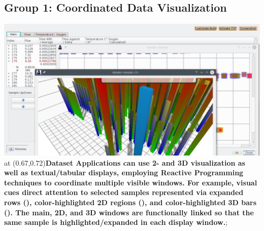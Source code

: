\atsptt
\begin{frame}{}
\section{Group 1: Coordinated Data Visualization}

	\pdfpageheight 30cm
	
\begin{annotatedFigure}{2mm}{-1mm}{\includegraphics[scale=1]{texs/coord.png}}
  \node [anchor=west,inner sep=14, text width=8.7cm,
  line width=1mm, fill opacity=0.9,
  draw = blue!20!black,
  top color=white,text=black,
  bottom color=blue!40,
  rounded corners=6pt
  ]
  at (0.67,0.72){\annfont\textbf{Dataset Applications can use 2- and 3D 
  		visualization as well as textual/tabular displays, employing Reactive 
  		Programming techniques to coordinate multiple visible windows.  For example, 
  		visual cues direct attention to selected samples represented via 
  		expanded rows (), color-highlighted 2D regions (), 
  		and color-highlighted 3D bars ().  The main, 2D, 
  		and 3D windows are functionally linked so that the same sample is 
  		highlighted/expanded in each display window.}};
  
              
\end{annotatedFigure}	
\end{frame}

